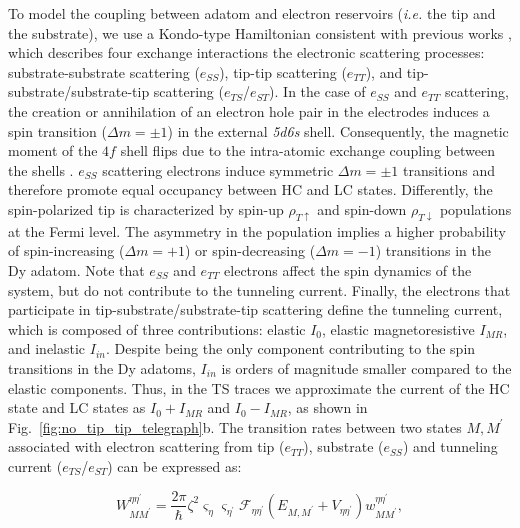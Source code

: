 \documentclass[
reprint,amsmath,amssymb,aps]{revtex4-2}
\begin{document}
To model the coupling between adatom and electron reservoirs (\textit{i.e.} the tip and the substrate), we use a Kondo-type Hamiltonian consistent with previous works \cite{anderson1966,schrieffer1966,appelbaum1967,delgado2010,loth2010,Ternes2015}, which describes four exchange interactions the electronic scattering processes: substrate-substrate scattering ($e_{SS}$), tip-tip scattering ($e_{TT}$), and tip-substrate/substrate-tip scattering ($e_{TS}$/$e_{ST}$). In the case of $e_{SS}$ and $e_{TT}$ scattering, the creation or annihilation of an electron hole pair in the electrodes induces a spin transition ($\Delta m=\pm 1$) in the external \textit{5d6s} shell. Consequently, the magnetic moment of the $4f$ shell flips due to the intra-atomic exchange coupling between the shells \cite{pivettaMeasuringIntraAtomicExchange2020}.
$e_{SS}$ scattering electrons induce symmetric $\Delta m=\pm 1$ transitions and therefore promote equal occupancy between HC and LC states.
Differently, the spin-polarized tip is characterized by spin-up $\rho_{T\uparrow}$ and spin-down $\rho_{T\downarrow}$ populations at the Fermi level. The asymmetry in the population implies a higher probability of spin-increasing ($\Delta m=+1$) or spin-decreasing ($\Delta m=-1$) transitions in the Dy adatom.
Note that $e_{SS}$ and $e_{TT}$ electrons affect the spin dynamics of the system, but do not contribute to the tunneling current.
Finally, the electrons that participate in tip-substrate/substrate-tip scattering define the tunneling current, which is composed of three contributions: elastic $I_0$, elastic magnetoresistive $I_{MR}$, and inelastic $I_{in}$.
Despite being the only component contributing to the spin transitions in the Dy adatoms, $I_{in}$ is orders of magnitude smaller compared to the elastic components. Thus, in the TS traces we approximate the current of the HC state and LC states as $I_0+I_{MR}$ and $I_0-I_{MR}$, as shown in Fig.~\ref{fig:no_tip_tip_telegraph}b.
The transition rates between two states $M,M^{\prime}$ associated with electron scattering from tip ($e_{TT}$), substrate ($e_{SS}$) and tunneling current ($e_{TS}$/$e_{ST}$) can be expressed as:

\begin{equation}
    W_{MM^{\prime}}^{\eta \eta^{\prime}}=\dfrac{2\pi}{\hbar} \zeta^2 \varsigma_{\eta} \varsigma_{\eta^{\prime}} \mathcal{F}_{\eta\eta^{\prime}}( E_{M,M^{\prime}}+V_{\eta \eta^{\prime}} )  w_{MM^{\prime}}^{\eta \eta^{\prime}},
    \label{eq:elec_rates}
\end{equation}
\end{document}
